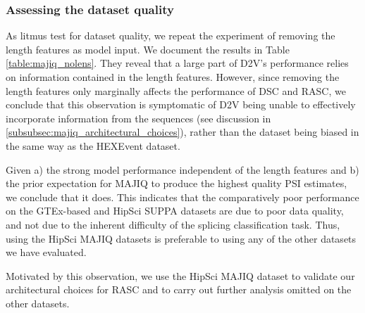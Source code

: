 \subsubsection{Assessing the dataset quality}

\begin{table}[h!]
	\centering
	\caption{
		Performance on the sensory neuron cell-based HipSci MAJIQ dataset with and without length features given. 
	}
	\label{table:majiq_nolens}
\end{table}

As litmus test for dataset quality, we repeat the experiment of removing the length features as model input. We document the results in Table \ref{table:majiq_nolens}.
They reveal that a large part of D2V's performance relies on information contained in the length features. However, since removing the length features only marginally affects the performance of DSC and RASC, we conclude that this observation is symptomatic of D2V being unable to effectively incorporate information from the sequences (see discussion in \ref{subsubsec:majiq_architectural_choices}), rather than the dataset being biased in the same way as the HEXEvent dataset.  

Given a) the strong model performance independent of the length features and b) the prior expectation for MAJIQ to produce the highest quality PSI estimates, we conclude that it does. This indicates that the comparatively poor performance on the GTEx-based and HipSci SUPPA datasets are due to poor data quality, and not due to the inherent difficulty of the splicing classification task. Thus, using the HipSci MAJIQ datasets is preferable to using any of the other datasets we have evaluated. 

Motivated by this observation, we use the HipSci MAJIQ dataset to validate our architectural choices for RASC and to carry out further analysis omitted on the other datasets.





